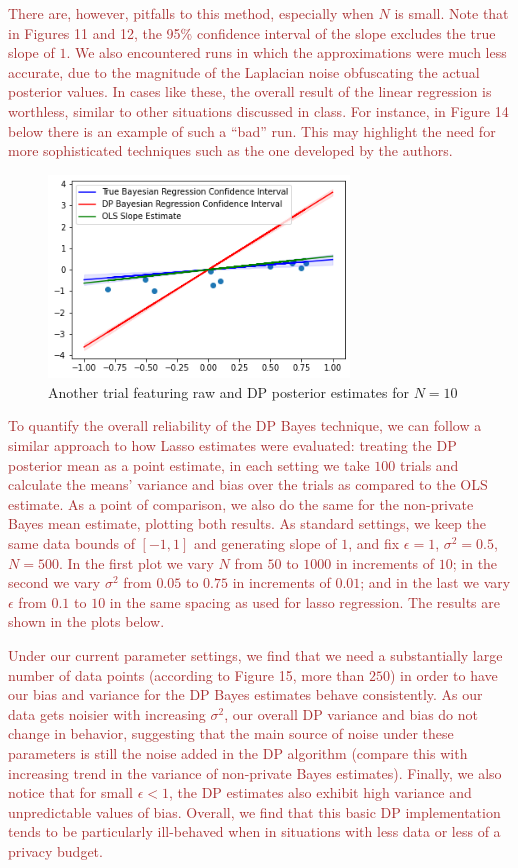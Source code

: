 \documentclass[11pt,conference]{IEEEtran}
\begin{document}
\textcolor{brown}{There are, however, pitfalls to this method, especially when $N$ is small. Note that in Figures 11 and 12, the 95\% confidence interval of the slope excludes the true slope of $1$. We also encountered runs in which the approximations were much less accurate, due to the magnitude of the Laplacian noise obfuscating the actual posterior values. In cases like these, the overall result of the linear regression is worthless, similar to other situations discussed in class. For instance, in Figure 14 below there is an example of such a ``bad'' run. This may highlight the need for more sophisticated techniques such as the one developed by the authors.}

\begin{figure}[htbp]
\centerline{\includegraphics[width=8cm]{plots/bayes_bad.png}}
\caption{Another trial featuring raw and DP posterior estimates for $N=10$} 
\label{fig}
\end{figure}

\textcolor{brown}{To quantify the overall reliability of the DP Bayes technique, we can follow a similar approach to how Lasso estimates were evaluated: treating the DP posterior mean as a point estimate, in each setting we take $100$ trials and calculate the means' variance and bias over the trials as compared to the OLS estimate. As a point of comparison, we also do the same for the non-private Bayes mean estimate, plotting both results. As standard settings, we keep the same data bounds of $[-1, 1]$ and generating slope of $1$, and fix $\epsilon=1$, $\sigma^2=0.5$, $N=500$. In the first plot we vary $N$ from $50$ to $1000$ in increments of $10$; in the second we vary $\sigma^2$ from $0.05$ to $0.75$ in increments of $0.01$; and in the last we vary $\epsilon$ from $0.1$ to $10$ in the same spacing as used for lasso regression. The results are shown in the plots below.}

\textcolor{brown}{Under our current parameter settings, we find that we need a substantially large number of data points (according to Figure 15, more than $250$) in order to have our bias and variance for the DP Bayes estimates behave consistently. As our data gets noisier with increasing $\sigma^2$, our overall DP variance and bias do not change in behavior, suggesting that the main source of noise under these parameters is still the noise added in the DP algorithm (compare this with increasing trend in the variance of non-private Bayes estimates). Finally, we also notice that for small $\epsilon<1$, the DP estimates also exhibit high variance and unpredictable values of bias. Overall, we find that this basic DP implementation tends to be particularly ill-behaved when in situations with less data or less of a privacy budget.}
\end{document}
